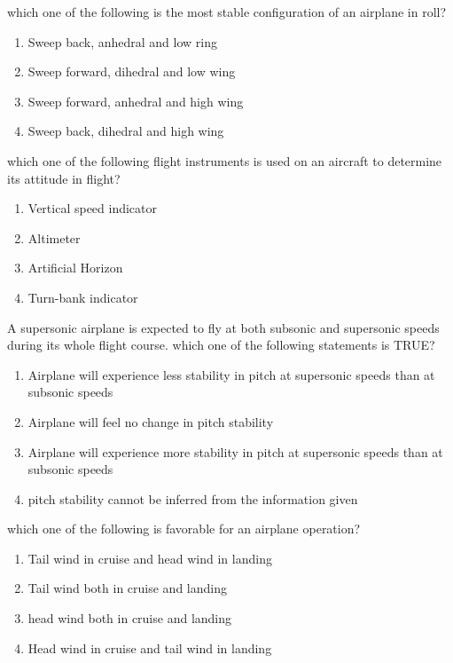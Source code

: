 \item which one of the following is the most stable configuration of an airplane in roll?
\begin{enumerate}
    \item Sweep back, anhedral and low ring
    \item Sweep forward, dihedral and low wing
    \item Sweep forward, anhedral and high wing
    \item Sweep back, dihedral and high wing \\
\end{enumerate}

\item which one of the following flight instruments is used on an aircraft to determine its attitude in flight?
\begin{enumerate}
    \item Vertical speed indicator
    \item Altimeter
    \item Artificial Horizon
    \item Turn-bank indicator \\
\end{enumerate}

\item A supersonic airplane is expected to fly at both subsonic and supersonic speeds during its whole flight course. which one of the following statements is TRUE?
\begin{enumerate}
    \item Airplane will experience less stability in pitch at supersonic speeds than at subsonic speeds
    \item Airplane will feel no change in pitch stability
    \item Airplane will experience more stability in pitch at supersonic speeds than at subsonic speeds
    \item pitch stability cannot be inferred from the information given \\
\end{enumerate}

\item which one of the following is favorable for an airplane operation?
\begin{enumerate}
    \item Tail wind in cruise and head wind in landing
    \item Tail wind both in cruise and landing
    \item head wind both in cruise and landing
    \item Head wind in cruise and tail wind in landing \\
\end{enumerate}

